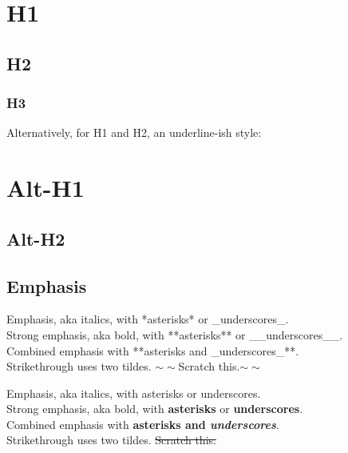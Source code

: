 \section{H1}

\subsection{H2}

\subsubsection{H3}

Alternatively, for H1 and H2, an underline-ish style:

\section{Alt-H1}

\subsection{Alt-H2}


\subsection{Emphasis}

\begin{mdframed}
Emphasis, aka italics, with *asterisks* or \_underscores\_. \\

Strong emphasis, aka bold, with **asterisks** or \_\_underscores\_\_. \\

Combined emphasis with **asterisks and \_underscores\_**. \\

Strikethrough uses two tildes. $\sim\sim$Scratch this.$\sim\sim$
\end{mdframed}

Emphasis, aka italics, with asterisks or underscores. \\

Strong emphasis, aka bold, with \textbf{asterisks} or \textbf{underscores}. \\

Combined emphasis with \textbf{asterisks and \textit{underscores}}. \\

Strikethrough uses two tildes. \sout{Scratch this.}


